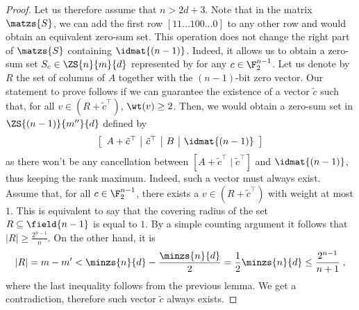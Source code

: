 \begin{proof}
Let us therefore assume that $n > 2d +3$. Note that in the matrix $\matzs{S}$, we can add the first row $[11\dots 1 00\dots 0]$ to any other row and would obtain an equivalent zero-sum set. This operation does not change the right part of $\matzs{S}$ containing $\idmat{(n-1)}$. Indeed, it allows us to obtain a zero-sum set $S_c \in \ZS{n}{m}{d}$ represented by 
for any $c \in \F_2^{n-1}$. Let us denote by $R$ the set of columns of $A$ together with the $(n-1)$-bit zero vector. Our statement to prove follows if we can guarantee the existence of a vector $\tilde{c}$  such that, for all $v \in (R+\tilde{c}^{\top})$, $\wt(v) \geq 2$. Then, we would obtain a zero-sum set in $\ZS{(n-1)}{m''}{d}$ defined by \[\left[ \begin{array}{c|c|c|c} 
A + \tilde{c}^{\top} & \tilde{c}^{\top} & B & \idmat{(n-1)}\end{array} \right]\]
as there won't be any cancellation between $[A +\tilde{c}^{\top} \mid \tilde{c}^{\top}]$ and $\idmat{(n-1)}$, thus keeping the rank maximum. Indeed, such a vector must always exist. Assume that, for all $c \in \F_2^{n-1}$, there exists a $v \in (R+\tilde{c}^{\top})$ with weight at most $1$. This is equivalent to say that the covering radius of the set $R \subseteq \field{n-1}$ is equal to $1$. By a simple counting argument it follows that $|R| \geq \frac{2^{n-1}}{n}$. On the other hand, it is 
$$
|R| = m - m' < \minzs{n}{d} - \frac{\minzs{n}{d}}{2} = \frac{1}{2} \minzs{n}{d}  \leq \frac{2^{n-1}}{n+1}\;,
$$
where the last inequality follows from the previous lemma.  We get a contradiction, therefore such vector $\tilde{c}$ always exists.
\end{proof}



